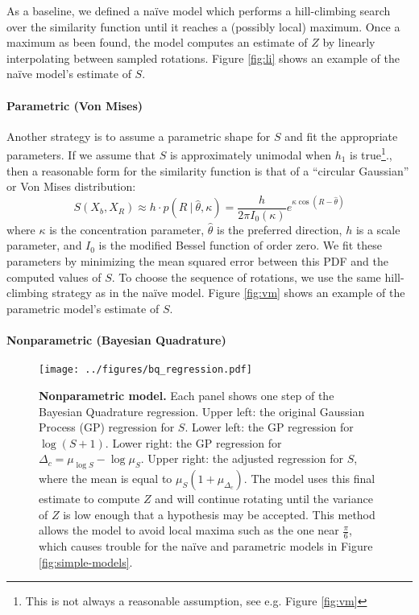 \documentclass{article} %
\newcommand{\naive}[0]{na\"ive}
\begin{document}
As a baseline, we defined a \naive{} model which performs a
hill-climbing search over the similarity function until it reaches a
(possibly local) maximum. Once a maximum as been found, the model
computes an estimate of $Z$ by linearly interpolating between sampled
rotations. Figure \ref{fig:li} shows an example of the \naive{}
model's estimate of $S$.

\paragraph{Parametric (Von Mises)}

Another strategy is to assume a parametric shape for $S$ and fit the
appropriate parameters. If we assume that $S$ is approximately
unimodal when $h_1$ is true\footnote{This is not always a reasonable
  assumption, see e.g. Figure \ref{fig:vm}}., then a reasonable form
for the similarity function is that of a ``circular Gaussian'' or Von
Mises distribution:
\begin{equation}
  S(X_b, X_R) \approx h\cdot{}p(R\ \vert\ \hat{\theta}, \kappa)=\frac{h}{2\pi I_0(\kappa)}e^{\kappa\cos(R-\hat{\theta})}
\end{equation}
where $\kappa$ is the concentration parameter, $\hat{\theta}$ is the
preferred direction, $h$ is a scale parameter, and $I_0$ is the
modified Bessel function of order zero. We fit these parameters by
minimizing the mean squared error between this PDF and the computed
values of $S$. To choose the sequence of rotations, we use the same
hill-climbing strategy as in the \naive{} model. Figure \ref{fig:vm}
shows an example of the parametric model's estimate of $S$. 

\paragraph{Nonparametric (Bayesian Quadrature)}

\begin{figure}[t]
  \centering
  \texttt{[image: ../figures/bq\_regression.pdf]}
  \caption{\textbf{Nonparametric model.} Each panel shows one step of
    the Bayesian Quadrature regression. Upper left: the original
    Gaussian Process (GP) regression for $S$. Lower left: the GP
    regression for $\log(S+1)$. Lower right: the GP regression for
    $\Delta_c=\mu_{\log S} - \log \mu_S$. Upper right: the adjusted
    regression for $S$, where the mean is equal to
    $\mu_S(1+\mu_{\Delta_c})$. The model uses this final estimate to
    compute $Z$ and will continue rotating until the variance of $Z$
    is low enough that a hypothesis may be accepted. This method
    allows the model to avoid local maxima such as the one near
    $\frac{\pi}{6}$, which causes trouble for the \naive{} and
    parametric models in Figure \ref{fig:simple-models}.}
  \label{fig:bq}
\end{figure}
\end{document}
